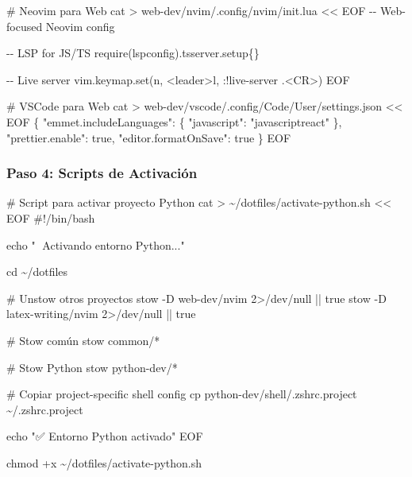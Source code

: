 \documentclass[
  doc,
  floatsintext,
  longtable,
  a4paper,
  nolmodern,
  notxfonts,
  notimes,
  12pt,
  colorlinks=true,linkcolor=blue,citecolor=blue,urlcolor=blue]{apa7}
\newenvironment{Shaded}{\begin{snugshade}}{\end{snugshade}}
\newcommand{\CommentTok}[1]{\textcolor[rgb]{0.37,0.37,0.37}{#1}}
\newcommand{\FunctionTok}[1]{\textcolor[rgb]{0.28,0.35,0.67}{#1}}
\newcommand{\NormalTok}[1]{\textcolor[rgb]{0.00,0.23,0.31}{#1}}
\newcommand{\OperatorTok}[1]{\textcolor[rgb]{0.37,0.37,0.37}{#1}}
\newcommand{\StringTok}[1]{\textcolor[rgb]{0.13,0.47,0.30}{#1}}
\begin{document}
\begin{Shaded}
\begin{Highlighting}[]
\CommentTok{\# Neovim para Web}
\FunctionTok{cat} \OperatorTok{\textgreater{}}\NormalTok{ web{-}dev/nvim/.config/nvim/init.lua }\OperatorTok{\textless{}\textless{} \textquotesingle{}EOF\textquotesingle{}}
\StringTok{{-}{-} Web{-}focused Neovim config}

\StringTok{{-}{-} LSP for JS/TS}
\StringTok{require(\textquotesingle{}lspconfig\textquotesingle{}).tsserver.setup\{\}}

\StringTok{{-}{-} Live server}
\StringTok{vim.keymap.set(\textquotesingle{}n\textquotesingle{}, \textquotesingle{}\textless{}leader\textgreater{}l\textquotesingle{}, \textquotesingle{}:!live{-}server .\textless{}CR\textgreater{}\textquotesingle{})}
\OperatorTok{EOF}

\CommentTok{\# VSCode para Web}
\FunctionTok{cat} \OperatorTok{\textgreater{}}\NormalTok{ web{-}dev/vscode/.config/Code/User/settings.json }\OperatorTok{\textless{}\textless{} \textquotesingle{}EOF\textquotesingle{}}
\StringTok{\{}
\StringTok{    "emmet.includeLanguages": \{}
\StringTok{        "javascript": "javascriptreact"}
\StringTok{    \},}
\StringTok{    "prettier.enable": true,}
\StringTok{    "editor.formatOnSave": true}
\StringTok{\}}
\OperatorTok{EOF}
\end{Highlighting}
\end{Shaded}

\subsubsection{Paso 4: Scripts de
Activación}\label{paso-4-scripts-de-activaciuxf3n}

\begin{Shaded}
\begin{Highlighting}[]
\CommentTok{\# Script para activar proyecto Python}
\FunctionTok{cat} \OperatorTok{\textgreater{}}\NormalTok{ \textasciitilde{}/dotfiles/activate{-}python.sh }\OperatorTok{\textless{}\textless{} \textquotesingle{}EOF\textquotesingle{}}
\StringTok{\#!/bin/bash}

\StringTok{echo "🐍 Activando entorno Python..."}

\StringTok{cd \textasciitilde{}/dotfiles}

\StringTok{\# Unstow otros proyectos}
\StringTok{stow {-}D web{-}dev/nvim 2\textgreater{}/dev/null || true}
\StringTok{stow {-}D latex{-}writing/nvim 2\textgreater{}/dev/null || true}

\StringTok{\# Stow común}
\StringTok{stow common/*}

\StringTok{\# Stow Python}
\StringTok{stow python{-}dev/*}

\StringTok{\# Copiar project{-}specific shell config}
\StringTok{cp python{-}dev/shell/.zshrc.project \textasciitilde{}/.zshrc.project}

\StringTok{echo "✅ Entorno Python activado"}
\OperatorTok{EOF}

\FunctionTok{chmod}\NormalTok{ +x \textasciitilde{}/dotfiles/activate{-}python.sh}
\end{Highlighting}
\end{Shaded}
\end{document}
